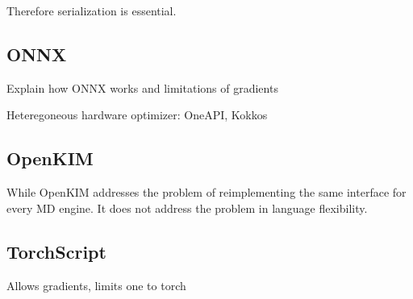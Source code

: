 
Therefore serialization is essential. 

\subsection{ONNX}

Explain how ONNX works and limitations of gradients

Heteregoneous hardware optimizer: OneAPI, Kokkos

\subsection{OpenKIM}

While OpenKIM addresses the problem of reimplementing the same interface for every MD engine.
It does not address the problem in language flexibility.

\subsection{TorchScript}
Allows gradients, limits one to torch


